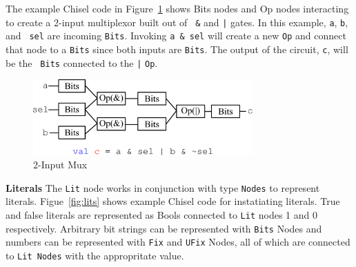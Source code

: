 The example Chisel code in Figure~\ref{fig:mux} shows Bits nodes and
Op nodes interacting to create a 2-input multiplexor built out of {\tt
\&} and {\tt |} gates. In this example,  {\tt a}, {\tt b}, and {\tt
 sel} are incoming {\tt Bits}. Invoking {\tt a \& sel} will create a
new {\tt Op} and connect that node to a {\tt Bits} since both inputs
are {\tt Bits}. The output of the circuit, {\tt c}, will be the {\tt
Bits} connected to the {\tt |} {\tt Op}. 

\begin{figure}[t]
\centering
\includegraphics[width=0.75\textwidth]{figures/mux.pdf}
\caption{2-Input Mux}
\label{fig:mux}
\end{figure}

{\bf Literals} The {\tt Lit} node works in conjunction with type {\tt Nodes} to
represent literals. Figue~\ref{fig:lits} shows example Chisel code for
instatiating literals. True and false literals are represented as Bools
connected to {\tt Lit} nodes 1 and 0 respectively. Arbitrary bit
strings can be represented with {\tt Bits} Nodes and numbers can be represented with
{\tt Fix} and {\tt UFix} Nodes, all of which are connected to {\tt Lit
Nodes} with the appropritate value.

